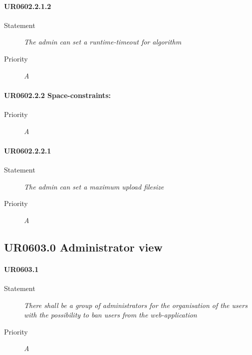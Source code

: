 \paragraph{UR0602.2.1.2}
\begin{description}
\item [Statement] \textit{
The admin can set a runtime-timeout for algorithm
}
\item [Priority] \textit{A}
\end{description}

\paragraph{UR0602.2.2 Space-constraints:}
\begin{description}
\item [Priority] \textit{A}
\end{description}

\paragraph{UR0602.2.2.1}
\begin{description}
\item [Statement] \textit{
The admin can set a maximum upload filesize
}
\item [Priority] \textit{A}
\end{description}

\subsection{UR0603.0 Administrator view}


\paragraph{UR0603.1}
\begin{description}
\item [Statement] \textit{
There shall be a group of administrators for the organisation of the users with the possibility to ban users from the web-application
}
\item [Priority] \textit{A}
\end{description}

